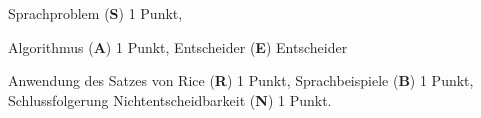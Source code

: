 \begin{bewertung}
\begin{teilaufgaben}
\item Sprachproblem (\textbf{S}) 1 Punkt,
\item Algorithmus (\textbf{A}) 1 Punkt, Entscheider (\textbf{E}) Entscheider
\item Anwendung des Satzes von Rice (\textbf{R}) 1 Punkt,
Sprachbeispiele (\textbf{B}) 1 Punkt,
Schlussfolgerung Nichtentscheidbarkeit (\textbf{N}) 1 Punkt.
\end{teilaufgaben}
\end{bewertung}
